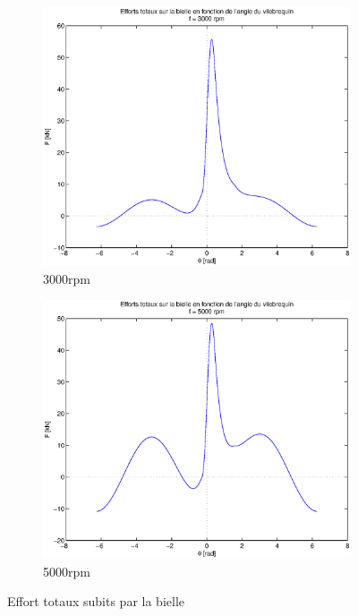 \documentclass{article}
\begin{document}
\begin{figure}[h!]
    \begin{subfigure}[h!]{0.45\textwidth}
    				\includegraphics[scale=0.5]{Schema/forces_tot_3000rpm.eps}
                \caption{\unit{3000}{rpm}}
                \label{fig:forces_tot_3000rpm}
    \end{subfigure}
    \qquad
    \begin{subfigure}[h!]{0.45\textwidth}
                \includegraphics[scale=0.5]{Schema/forces_tot_5000rpm.eps}
                \caption{\unit{5000}{rpm}}
                \label{fig:forces_tot_5000rpm}
    \end{subfigure}
    \caption{Effort totaux subits par la bielle}
    \label{fig:Effort_totaux}
\end{figure}
\end{document}
